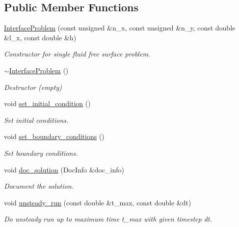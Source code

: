 \subsection*{Public Member Functions}
\begin{DoxyCompactItemize}
\item 
\hyperlink{classInterfaceProblem_a83023535d663a2a6558959f36bf6e1e7}{Interface\+Problem} (const unsigned \&n\+\_\+x, const unsigned \&n\+\_\+y, const double \&l\+\_\+x, const double \&h)
\begin{DoxyCompactList}\small\item\em Constructor for single fluid free surface problem. \end{DoxyCompactList}\item 
\hyperlink{classInterfaceProblem_a90c191f8046069099b199743e7ce7111}{$\sim$\+Interface\+Problem} ()
\begin{DoxyCompactList}\small\item\em Destructor (empty) \end{DoxyCompactList}\item 
void \hyperlink{classInterfaceProblem_a0d3af8378c4f0a6e38636be958c300d5}{set\+\_\+initial\+\_\+condition} ()
\begin{DoxyCompactList}\small\item\em Set initial conditions. \end{DoxyCompactList}\item 
void \hyperlink{classInterfaceProblem_a844445832ad7a32aa9f5d03ffdb40ebb}{set\+\_\+boundary\+\_\+conditions} ()
\begin{DoxyCompactList}\small\item\em Set boundary conditions. \end{DoxyCompactList}\item 
void \hyperlink{classInterfaceProblem_a49714e35e94f7d2af0b6ddd22b851f52}{doc\+\_\+solution} (Doc\+Info \&doc\+\_\+info)
\begin{DoxyCompactList}\small\item\em Document the solution. \end{DoxyCompactList}\item 
void \hyperlink{classInterfaceProblem_adf1f4e43d10939e4323e0e315b711085}{unsteady\+\_\+run} (const double \&t\+\_\+max, const double \&dt)
\begin{DoxyCompactList}\small\item\em Do unsteady run up to maximum time t\+\_\+max with given timestep dt. \end{DoxyCompactList}\item 

\end{DoxyCompactItemize}

